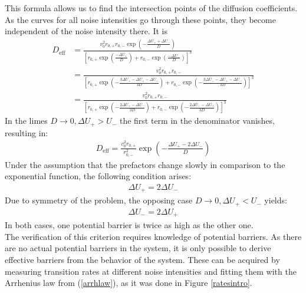 \documentclass[12pt,a4paper]{article}
\begin{document}
This formula allows us to find the intersection points of the diffusion coefficients. As the curves for all noise intensities go through these points, they become independent of the noise intensity there.
It is
\begin{align*}
D_{\text{eff}}&=\frac{v_0^2r_{0,+}r_{0,-}\exp\left(-\frac{\Delta U_++\Delta U_-}{D}\right)}{\left[r_{0,+}\exp(\frac{-\Delta U_+}{D})+r_{0,-}\exp\left(\frac{-\Delta U_-}{D}\right)\right]^3}\\&=\frac{v_0^2r_{0,+}r_{0,-}}{\left[r_{0,+}\exp\left(-\frac{3\Delta U_+-\Delta U_+-\Delta U_-}{3D}\right)+r_{0,-}\exp\left(-\frac{3\Delta U_--\Delta U_+ -\Delta U_-}{3D}\right)\right]^3}\\&=\frac{v_0^2r_{0,+}r_{0,-}}{\left[r_{0,+}\exp\left(-\frac{2\Delta U_+-\Delta U_-}{3D}\right)+r_{0,-}\exp\left(-\frac{2\Delta U_--\Delta U_+}{3D}\right)\right]^3}
\end{align*}
In the limes $D\rightarrow 0,\Delta U_+>U_-$ the first term in the denominator vanishes, resulting in:
\begin{align*}
D_{\text{eff}}=\frac{v_0^2r_{0,+}}{r_{0,-}^2}\exp\left(-\frac{\Delta U_+-2\Delta U_-}{D}\right)
\end{align*}
Under the assumption that the prefactors change slowly in comparison to the exponential function, the following condition arises:
\begin{align}\label{fcrit}
\Delta U_+=2\Delta U_-
\end{align}
Due to symmetry of the problem, the opposing case $D\rightarrow 0,\Delta U_+<U_-$ yields:
\begin{align*}
\Delta U_-=2\Delta U_+
\end{align*}
In both cases, one potential barrier is twice as high as the other one.\\
The verification of this criterion requires knowledge of potential barriers. As there are no actual potential barriers in the system, it is only possible to derive effective barriers from the behavior of the system.
These can be acquired by measuring transition rates at different noise intensities and fitting them with the Arrhenius law from (\ref{arrhlaw}), as it was done in Figure \ref{ratesintro}.
\end{document}
